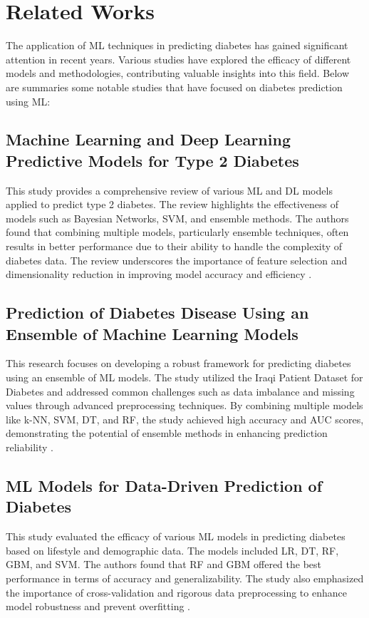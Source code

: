 \section{Related Works}

The application of ML techniques in predicting diabetes has gained significant attention in recent years. Various studies have explored the efficacy of different models and methodologies, contributing valuable insights into this field. Below are summaries some notable studies that have focused on diabetes prediction using ML:
\subsection{Machine Learning and Deep Learning Predictive Models for Type 2 Diabetes}
This study provides a comprehensive review of various ML and DL models applied to predict type 2 diabetes. The review highlights the effectiveness of models such as Bayesian Networks, SVM, and ensemble methods. The authors found that combining multiple models, particularly ensemble techniques, often results in better performance due to their ability to handle the complexity of diabetes data. The review underscores the importance of feature selection and dimensionality reduction in improving model accuracy and efficiency \cite{Ref15}.
\subsection{Prediction of Diabetes Disease Using an Ensemble of Machine Learning Models}
This research focuses on developing a robust framework for predicting diabetes using an ensemble of ML models. The study utilized the Iraqi Patient Dataset for Diabetes and addressed common challenges such as data imbalance and missing values through advanced preprocessing techniques. By combining multiple models like k-NN, SVM, DT, and RF, the study achieved high accuracy and AUC scores, demonstrating the potential of ensemble methods in enhancing prediction reliability \cite{Ref16}. 
\subsection{ML Models for Data-Driven Prediction of Diabetes}
This study evaluated the efficacy of various ML models in predicting diabetes based on lifestyle and demographic data. The models included LR, DT, RF, GBM, and SVM. The authors found that RF and GBM offered the best performance in terms of accuracy and generalizability. The study also emphasized the importance of cross-validation and rigorous data preprocessing to enhance model robustness and prevent overfitting \cite{Ref17}. 

